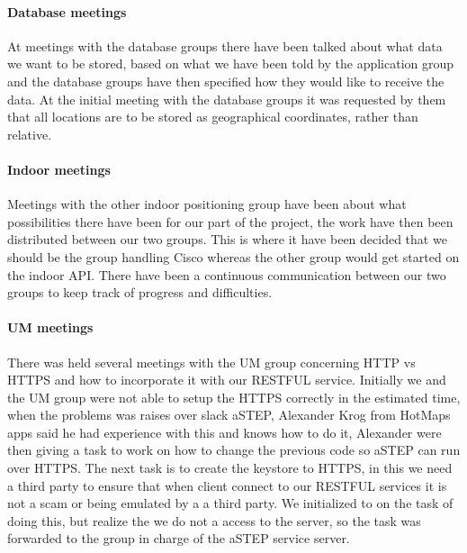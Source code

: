 \paragraph{Database meetings}
At meetings with the database groups there have been talked about what data we want to be stored, based on what we have been told by the application group and the database groups have then specified how they would like to receive the data. At the initial meeting with the database groups it was requested by them that all locations are to be stored as geographical coordinates, rather than relative.%

\paragraph{Indoor meetings}
Meetings with the other indoor positioning group have been about what possibilities there have been for our part of the project, the work have then been distributed between our two groups. This is where it have been decided that we should be the group handling Cisco whereas the other group would get started on the indoor API. There have been a continuous communication between our two groups to keep track of progress and difficulties. 

\paragraph{UM meetings}
There was held several meetings with the UM group concerning HTTP vs HTTPS and how to incorporate it with our RESTFUL service. Initially we and the UM group were not able to setup the HTTPS correctly in the estimated time, when the problems was raises over slack aSTEP, Alexander Krog from HotMaps apps said he had experience with this and knows how to do it, Alexander were then giving a task to work on how to change the previous code so aSTEP can run over HTTPS. The next task is to create the keystore to HTTPS, in this we need a third party to ensure that when client connect to our RESTFUL services it is not a scam or being emulated by a a third party. We initialized to on the task of doing this, but realize the we do not a access to the server, so the task was forwarded to the group in charge of the aSTEP service server. 